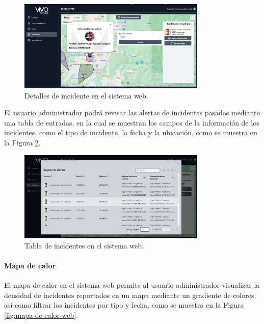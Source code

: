 \begin{figure}[H]
    \centering
    \includegraphics[width=0.8\textwidth]{chapters/III-resultados-y-discusion/resources/images/detalles-incidente-web.png}
    \caption{Detalles de incidente en el sistema web.}
    \label{fig:detalles-incidente-web}
\end{figure}

El usuario administrador podrá revisar las alertas de incidentes pasados mediante una tabla de entradas, en la cual se muestran los
campos de la información de los incidentes, como el tipo de incidente, la fecha y la ubicación, como se muestra en la Figura
\ref{fig:tabla-incidentes-web}.

\begin{figure}[H]
    \centering
    \includegraphics[width=0.8\textwidth]{chapters/III-resultados-y-discusion/resources/images/tabla-incidentes-web.png}
    \caption{Tabla de incidentes en el sistema web.}
    \label{fig:tabla-incidentes-web}
\end{figure}

\paragraph{Mapa de calor}
El mapa de calor en el sistema web permite al usuario administrador visualizar la densidad de incidentes reportados en un mapa
mediante un gradiente de colores, así como filtrar los incidentes por tipo y fecha, como se muestra en la Figura \ref{fig:mapa-de-calor-web}.

